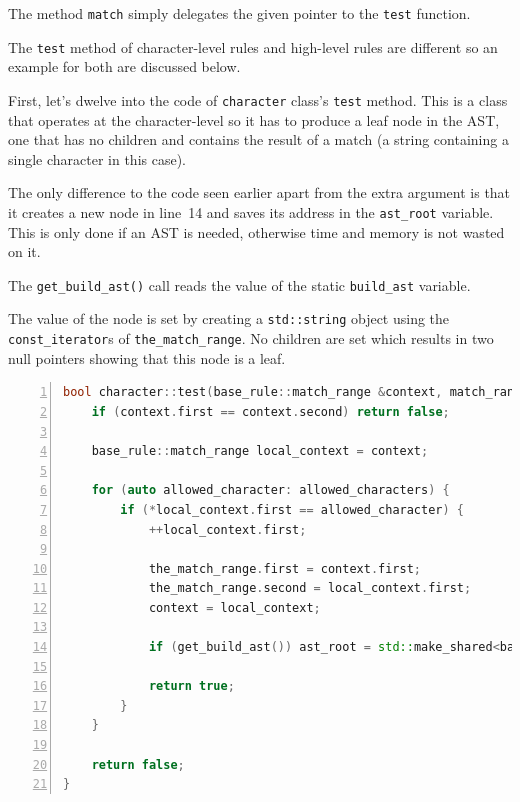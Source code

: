\documentclass[12pt]{article}
\begin{document}
The method \texttt{match} simply delegates the given pointer to the \texttt{test} function.

The \texttt{test} method of character-level rules and high-level rules are different so an example for both
are discussed below.

First, let's dwelve into the code of \texttt{character} class's \texttt{test} method. This is a class that
operates at the character-level so it has to produce a leaf node in the AST, one that has no children and
contains the result of a match (a string containing a single character in this case).

The only difference to the code seen earlier apart from the extra argument is that it creates a new node in
line~14 and saves its address in the \texttt{ast\_root} variable. This is only done if an AST is needed,
otherwise time and memory is not wasted on it.

The \texttt{get\_build\_ast()} call reads the value of the static \texttt{build\_ast} variable.

The value of the node is set by creating a \texttt{std::string} object using the \texttt{const\_iterator}s
of \texttt{the\_match\_range}. No children are set which results in two null pointers showing that this node
is a leaf.

\begin{center}
	\begin{minipage}[ht]{0.95\textwidth}
		\begin{lstlisting}[language=C++, breaklines=true, numbers=left]
bool character::test(base_rule::match_range &context, match_range &the_match_range, std::shared_ptr<base_rule::node> &ast_root) {
	if (context.first == context.second) return false;

	base_rule::match_range local_context = context;

	for (auto allowed_character: allowed_characters) {
		if (*local_context.first == allowed_character) {
			++local_context.first;

			the_match_range.first = context.first;
			the_match_range.second = local_context.first;
			context = local_context;

			if (get_build_ast()) ast_root = std::make_shared<base_rule::node>(std::string(the_match_range.first, the_match_range.second)); 

			return true;
		}
	}

	return false;
}
		\end{lstlisting}
	\end{minipage}
\end{center}
\end{document}
